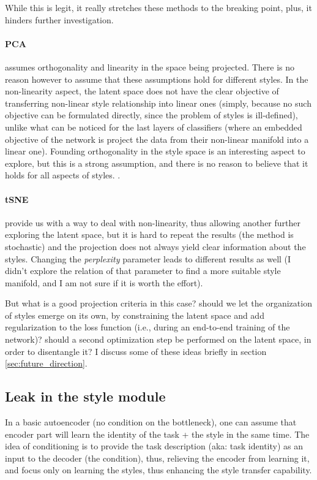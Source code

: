 While this is legit, it really stretches these methods to the breaking point, plus, it hinders further investigation.

\paragraph{PCA} assumes orthogonality and linearity in the space being projected. There is no reason however to assume that these assumptions hold for different styles.
In the non-linearity aspect, the latent space does not have the clear objective of transferring non-linear style relationship into linear ones (simply, because no such objective can be formulated directly, since the problem of styles is ill-defined), unlike what can be noticed for the last layers of classifiers (where an embedded objective of the network is project the data from their non-linear manifold into a linear one).
Founding orthogonality in the style space is an interesting aspect to explore, but this is a strong assumption, and there is no reason to believe that it holds for all aspects of styles.
.
\paragraph{tSNE} provide us with a way to deal with non-linearity, thus allowing another further exploring the latent space, but it is hard to repeat the results (the method is stochastic) and the projection does not always yield clear information about the styles. Changing the \textit{perplexity} parameter leads to different results as well (I didn't explore the relation of that parameter to find a more suitable style manifold, and I am not sure if it is worth the effort).

But what is a good projection criteria in this case? should we let the organization of styles emerge on its own, by constraining the latent space and add regularization to the loss function (i.e., during an end-to-end training of the network)? should a second optimization step be performed on the latent space, in order to disentangle it? I discuss some of these ideas briefly in section \ref{sec:future_direction}.

\subsection{Leak in the style module}
In a basic autoencoder (no condition on the bottleneck), one can assume that encoder part will learn the identity of the task + the style in the same time. The idea of conditioning is to provide the task description (aka: task identity) as an input to the decoder (the condition), thus, relieving the encoder from learning it, and focus only on learning the styles, thus enhancing the style transfer capability.

